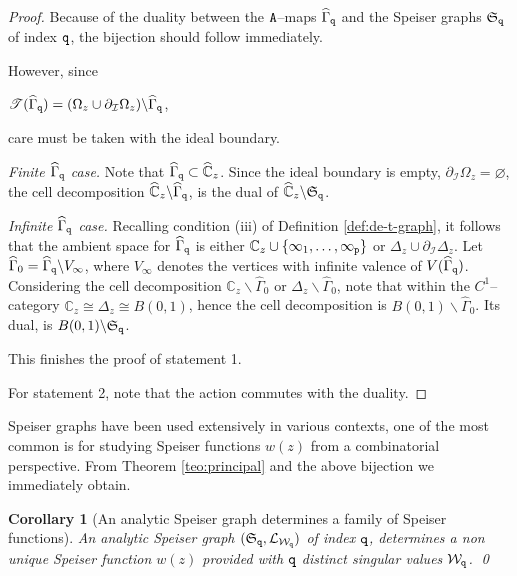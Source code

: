 \documentclass[final,3p,times]{elsarticle}
\newcommand{\CC}{\ensuremath{{\mathbb C}}}
\newcommand{\CW}{\ensuremath{{\widehat{\mathbb C}}}}
\newtheorem{corollary}[theorem]{Corollary}
\theoremstyle{definition}
\begin{document}
\begin{proof}
Because of the duality between the $\tt A$--maps $\widehat{\Gamma}_{\tt q}$ 
and the Speiser graphs $\mathfrak{S}_{\tt q}$ of index $\tt q$, 
the bijection should follow immediately.

\noindent
However, since 

\centerline{$
\mathscr{T}(\widehat{\Gamma}_{\tt q} )= 
(\Omega_z \cup \partial_{\mathcal{I}}\Omega_z ) \backslash \widehat{\Gamma}_{\tt q}
$,}

\noindent
care must be taken with the ideal boundary.

\noindent
\emph{Finite $\widehat{\Gamma}_{\tt q}$ case.} 
Note that $\widehat{\Gamma}_{\tt q} \subset \CW_z$.
Since the ideal boundary is empty, 
$\partial_{\mathcal{I}}\Omega_z=\varnothing$,
the cell decomposition $\CW_z \backslash\widehat{\Gamma}_{\tt q}$, 
is the dual of $\CW_z \backslash\mathfrak{S}_{\tt q}$. 

\noindent
\emph{Infinite $\widehat{\Gamma}_{\tt q}$ case.} 
Recalling condition (iii) of Definition \ref{def:de-t-graph}, 
it follows that the ambient space for $\widehat{\Gamma}_{\tt q}$ is either 
$\CC_z\cup \{\infty_1,\ldots,\infty_{\tt p} \}$ or $\Delta_z \cup \partial_{\mathcal{I}} \Delta_z$.
Let $\widehat{\Gamma}_0=\widehat{\Gamma}_{\tt q}\backslash V_\infty$, where
$V_\infty $ denotes the vertices with infinite valence of
$V(\widehat{\Gamma}_{\tt q})$. 
Considering the cell decomposition 
$\CC_z \backslash \widehat{\Gamma}_0$ or $\Delta_z\backslash\widehat{\Gamma}_0$, 
note that within the $C^1$--category $\CC_z \cong \Delta_z \cong B(0,1)$, hence 
the cell decomposition is $B(0,1)\backslash\widehat{\Gamma}_0$.
Its dual, is $B(0,1)\backslash\mathfrak{S}_{\tt q}$. 


\noindent
This finishes the proof of statement 1.

For statement 2,
note that the action commutes with the duality.
\end{proof}

Speiser graphs have been used extensively in various contexts, one of the most
common is for studying Speiser functions $w(z)$ from a combinatorial perspective. 
From Theorem \ref{teo:principal} and the above bijection 
we immediately obtain.


\begin{corollary}[An analytic Speiser graph determines a family of Speiser functions]
\label{cor:Speiser-graph-a-Speiser-function}
An analytic Speiser graph $(\mathfrak{S}_{\tt q},\mathcal{L}_{\mathcal{W}_{\tt q}})$ 
of index $\tt q$, determines a 
non unique Speiser function $w(z)$ 
provided with $\tt q$ distinct singular values $\mathcal{W}_{\tt q}$.
\hfill\qed
\end{corollary}
\end{document}
